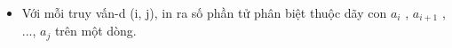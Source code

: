 \begin{itemize}
	\item     Với mỗi truy vấn-d (i, j), in ra số phần tử phân biệt thuộc   dãy con $a_{i}$    , $a_{i+1}$    , ...,   $a_{j}$    trên một dòng.    


\end{itemize}